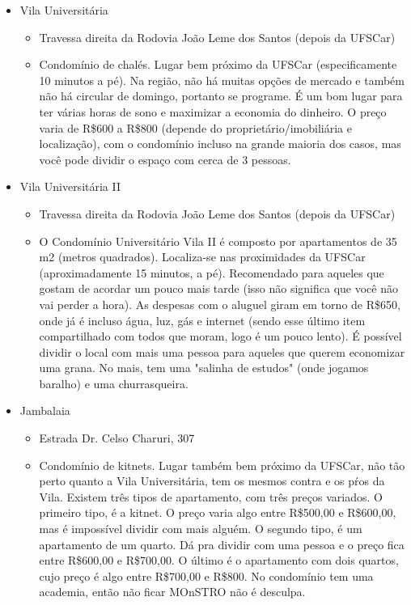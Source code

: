 \begin{itemize}
  \item Vila Universitária
    \begin{itemize}
      \item Travessa direita da Rodovia João Leme dos Santos (depois da UFSCar)
      \item Condomínio de chalés. Lugar bem próximo da UFSCar (especificamente 10 minutos a pé).
          Na região, não há muitas opções de mercado e também não há circular de domingo, portanto se programe.
            É um bom lugar para ter várias horas de sono e maximizar a economia do dinheiro. O preço varia de R\$600 a R\$800 (depende do proprietário/imobiliária e localização), com o condomínio incluso na grande maioria dos casos, mas você pode dividir o espaço com cerca de 3 pessoas.
    \end{itemize}

  \item Vila Universitária II
    \begin{itemize}
      \item Travessa direita da Rodovia João Leme dos Santos (depois da UFSCar)
      \item O Condomínio Universitário Vila II é composto por apartamentos de 35 m2 (metros quadrados). Localiza-se nas proximidades da UFSCar (aproximadamente 15 minutos, a pé). Recomendado para aqueles que gostam de acordar um pouco mais tarde (isso não significa que você não vai perder a hora). As despesas com o aluguel giram em torno de R\$650, onde já é incluso água, luz, gás e internet (sendo esse último item compartilhado com todos que moram, logo é um pouco lento). É possível dividir o
          local com mais uma pessoa para aqueles que querem economizar uma grana. No mais, tem uma "salinha de estudos"  (onde jogamos baralho) e uma churrasqueira.
    \end{itemize}

  \item Jambalaia
    \begin{itemize}
      \item Estrada Dr. Celso Charuri, 307
      \item Condomínio de kitnets. Lugar também bem próximo da UFSCar, não tão perto quanto a Vila Universitária, tem os mesmos contra e os pŕos da Vila. Existem três tipos de apartamento, com três preços variados. O primeiro tipo, é a kitnet. O preço varia algo entre R\$500,00 e R\$600,00, mas é impossível dividir com mais alguém. O segundo tipo, é um apartamento de um quarto. Dá pra dividir com uma pessoa e o preço fica entre R\$600,00 e R\$700,00. O último é o apartamento com dois quartos, cujo preço é algo entre R\$700,00 e R\$800. No condomínio tem uma academia, então não ficar MOnSTRO não é desculpa.
    \end{itemize}


\end{itemize}
